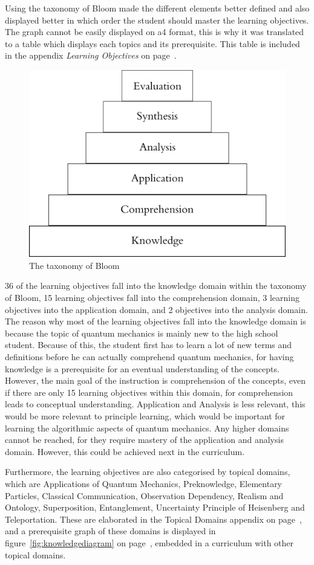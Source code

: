 \documentclass[11pt,twoside]{report} %
\begin{document}
Using the taxonomy of Bloom made the different elements better defined and also displayed better in which order the student should master the learning objectives. The graph cannot be easily displayed on a4 format, this is why it was translated to a table which displays each topics and its prerequisite. This table is included in the appendix \emph{Learning Objectives} on page~\pageref{app:learningobjectives}.

\begin{figure}[h]
\centering
\includegraphics[width=.4\textwidth]{bloom}
\caption{The taxonomy of Bloom \protect\cite{bloom}\label{fig:bloom}}
\end{figure}

36 of the learning objectives fall into the knowledge domain within the taxonomy of Bloom, 15 learning objectives fall into the comprehension domain, 3 learning objectives into the application domain, and 2 objectives into the analysis domain. The reason why most of the learning objectives fall into the knowledge domain is because the topic of quantum mechanics is mainly new to the high school student. Because of this, the student first has to learn a lot of new terms and definitions before he can actually comprehend quantum mechanics, for having knowledge is a prerequisite for an eventual understanding of the concepts. However, the main goal of the instruction is comprehension of the concepts, even if there are only 15 learning objectives within this domain, for comprehension leads to conceptual understanding. Application and Analysis is less relevant, this would be more relevant to principle learning, which would be important for learning the algorithmic aspects of quantum mechanics. Any higher domains cannot be reached, for they require mastery of the application and analysis domain. However, this could be achieved next in the curriculum.

Furthermore, the learning objectives are also categorised by topical domains, which are Applications of Quantum Mechanics, Preknowledge, Elementary Particles, Classical Communication, Observation Dependency, Realism and Ontology, Superposition, Entanglement, Uncertainty Principle of Heisenberg and Teleportation. These are elaborated in the Topical Domains appendix on page~\pageref{app:topicaldomains}, and a prerequisite graph of these domains is displayed in figure~\ref{fig:knowledgediagram} on page~\pageref{fig:knowledgediagram}, embedded in a curriculum with other topical domains.
\end{document}
